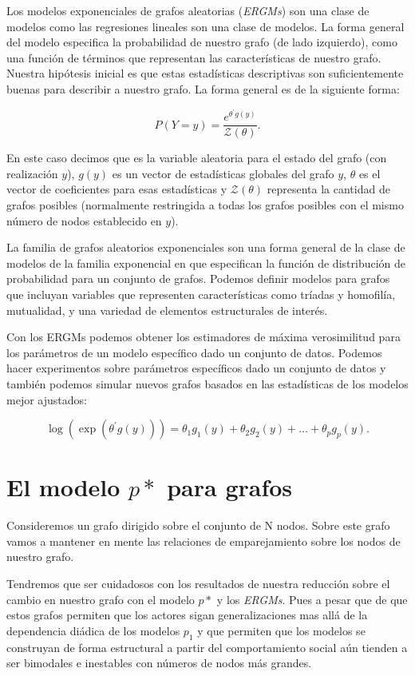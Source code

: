 Los modelos exponenciales de grafos aleatorias (\textit{ERGMs}) son una clase de modelos como las regresiones lineales son una clase de modelos. La forma general del modelo especifica la probabilidad de nuestro grafo (de lado izquierdo), como una función de términos que representan las características de nuestro grafo. Nuestra hipótesis inicial es que estas estadísticas descriptivas son suficientemente buenas para describir a nuestro grafo. La forma general es de la siguiente forma:

$$P(Y = y) = \frac{e^{\theta^{'}g(y)}}{\mathcal{Z}(\theta)}.$$

En este caso decimos que  es la variable aleatoria para el estado del grafo (con realización $y$),
$g (y)$ es un vector de estadísticas globales del grafo $y$, $\theta$ es el vector de coeficientes para esas estadísticas y $\mathcal{Z} (\theta)$ representa la cantidad de grafos posibles (normalmente restringida a todas los grafos posibles con el mismo número de nodos establecido en $y$).

La familia de grafos aleatorios exponenciales son una forma general de la clase de modelos de la familia exponencial en que especifican la función de distribución de probabilidad para un conjunto de grafos. Podemos definir modelos para grafos que incluyan variables que representen características como tríadas y homofilía, mutualidad, y una variedad de elementos estructurales de interés.

Con los ERGMs podemos obtener los estimadores de máxima verosimilitud para los parámetros de un modelo específico dado un conjunto de datos. Podemos hacer experimentos sobre parámetros específicos dado un conjunto de datos y también podemos simular nuevos grafos basados en las estadísticas de los modelos mejor ajustados:



$$\log \left( \exp \left( \theta ^ { \prime } g ( y ) \right) \right) = \theta _ { 1 } g _ { 1 } ( y ) + \theta _ { 2 } g _ { 2 } ( y ) + \ldots + \theta _ { p } g _ { p } ( y ).$$

\section{El modelo $p*$ para grafos}

Consideremos un grafo dirigido sobre el conjunto de N nodos. Sobre este grafo vamos a mantener en mente las relaciones de emparejamiento sobre los nodos de nuestro grafo.

Tendremos que ser cuidadosos con los resultados de nuestra reducción sobre el cambio en nuestro grafo con el modelo $p*$ y los \textit{ERGMs}. Pues a pesar que de que estos grafos permiten que los actores sigan generalizaciones mas allá de la dependencia diádica de los modelos $p_1$ y que permiten que los modelos se construyan de forma estructural a partir del comportamiento social aún tienden a ser bimodales e inestables con números de nodos más grandes.


